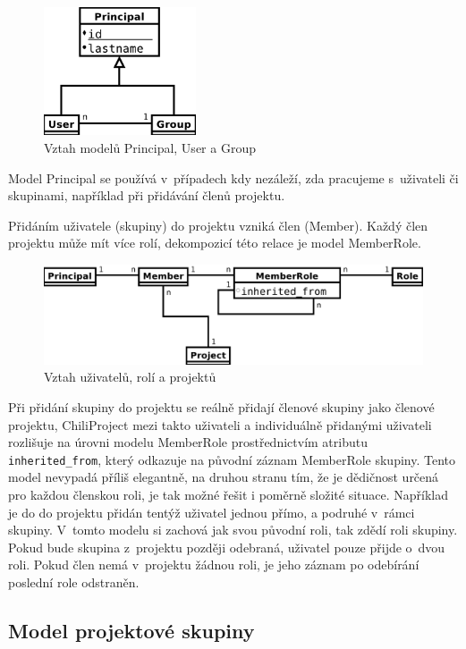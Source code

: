 \documentclass[thesis=B,czech]{FITthesis}[2012/05/02]
\begin{document}
\begin{figure}[htbp]
\centering
\includegraphics[width=0.4\textwidth]{group-er1.pdf}
\caption{Vztah modelů Principal, User a Group}
\end{figure}

Model Principal se používá v~případech kdy nezáleží, zda pracujeme
s~uživateli či skupinami, například při přidávání členů projektu.

Přidáním uživatele (skupiny) do projektu vzniká člen (Member). Každý
člen projektu může mít více rolí, dekompozicí této relace je model
\mbox{MemberRole}.

\begin{figure}[htbp]
\centering
\includegraphics[width=1\textwidth]{group-er2.pdf}
\caption{Vztah uživatelů, rolí a projektů}
\end{figure}

Při přidání skupiny do projektu se reálně přidají členové skupiny jako
členové projektu, ChiliProject mezi takto  uživateli a
individuálně přidanými uživateli rozlišuje na úrovni modelu MemberRole
prostřednictvím atributu \lstinline!inherited_from!, který odkazuje na
původní záznam MemberRole skupiny. Tento model nevypadá příliš
elegantně, na druhou stranu tím, že je dědičnost určená pro každou
členskou roli, je tak možné řešit i poměrně složité situace. Například
je do do projektu přidán tentýž uživatel jednou přímo, a podruhé v~rámci
skupiny. V~tomto modelu si zachová jak svou původní roli, tak zdědí roli
skupiny. Pokud bude skupina z~projektu později odebraná, uživatel pouze
přijde o~dvou roli. Pokud člen nemá v~projektu žádnou roli, je jeho
záznam po odebírání poslední role odstraněn.

\subsection{Model projektové skupiny}
\end{document}
